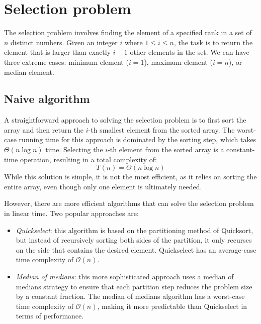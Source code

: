 \section{Selection problem}

The selection problem involves finding the element of a specified rank in a set of $n$ distinct numbers.
Given an integer $i$ where $1\leq i \leq n$, the task is to return the element that is larger than exactly $i-1$ other elements in the set.
We can have three extreme cases: minimum element ($i=1$), maximum element ($i=n$), or median element. 

\subsection{Naive algorithm}
A straightforward approach to solving the selection problem is to first sort the array and then return the $i$-th smallest element from the sorted array.
The worst-case running time for this approach is dominated by the sorting step, which takes $\Theta(n\log n)$ time. 
Selecting the $i$-th element from the sorted array is a constant-time operation, resulting in a total complexity of:
\[T(n)=\Theta(n\log n)\]
While this solution is simple, it is not the most efficient, as it relies on sorting the entire array, even though only one element is ultimately needed.

However, there are more efficient algorithms that can solve the selection problem in linear time. 
Two popular approaches are:
\begin{itemize}
    \item \textit{Quickselect}: this algorithm is based on the partitioning method of Quicksort, but instead of recursively sorting both sides of the partition, it only recurses on the side that contains the desired element.
        Quickselect has an average-case time complexity of $\mathcal{O}(n)$. 
    \item \textit{Median of medians}: this more sophisticated approach uses a median of medians strategy to ensure that each partition step reduces the problem size by a constant fraction.
        The median of medians algorithm has a worst-case time complexity of $\mathcal{O}(n)$, making it more predictable than Quickselect in terms of performance.
\end{itemize}

